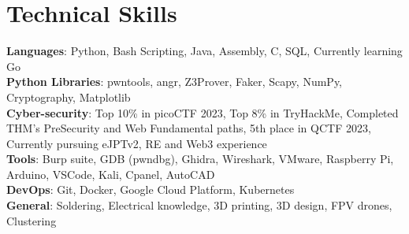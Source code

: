 \section{Technical Skills}

\begin{itemize}[leftmargin=0.15in, label={}]
    \small{\item{
        \textbf{Languages}{: Python, Bash Scripting, Java, Assembly, C, SQL, Currently learning Go} \\ \vspace{2mm}
        \textbf{Python Libraries}{: pwntools, angr, Z3Prover, Faker, Scapy, NumPy, Cryptography, Matplotlib} \\ \vspace{2mm}
        \textbf{Cyber-security}{: Top 10\% in picoCTF 2023, Top 8\% in TryHackMe, Completed THM's PreSecurity and Web Fundamental paths, 5th place in QCTF 2023, Currently pursuing eJPTv2, RE and Web3 experience} \\ \vspace{2mm}
        \textbf{Tools}{: Burp suite, GDB (pwndbg), Ghidra, Wireshark, VMware, Raspberry Pi, Arduino, VSCode, Kali, Cpanel, AutoCAD} \\ \vspace{2mm}
        \textbf{DevOps}{: Git, Docker, Google Cloud Platform, Kubernetes}\\ \vspace{2mm}
        \textbf{General}{: Soldering, Electrical knowledge, 3D printing, 3D design, FPV drones, Clustering}\\

    }}
\end{itemize}